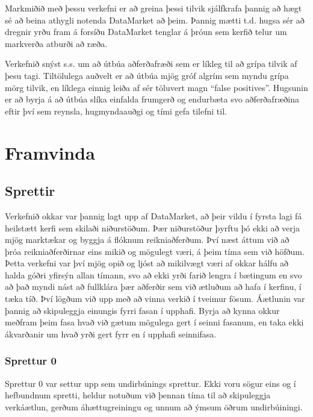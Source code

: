 \documentclass{article}
\begin{document}
Markmiðið með þessu verkefni er að greina þessi tilvik
sjálfkrafa þannig að hægt sé að beina athygli notenda
DataMarket að þeim. Þannig mætti t.d. hugsa sér að
dregnir yrðu fram á forsíðu DataMarket tenglar á þróun
sem kerfið telur um markverða atburði að ræða.

Verkefnið snýst s.s. um að útbúa aðferðafræði sem er
líkleg til að grípa tilvik af þesu tagi. Tiltölulega
auðvelt er að útbúa mjög gróf algrím sem myndu grípa
mörg tilvik, en líklega einnig leiða af sér töluvert
magn “false positives”. Hugsunin er að byrja á að útbúa
slíka einfalda frumgerð og endurbæta svo aðferðafræðina
eftir því sem reynsla, hugmyndaauðgi og tími gefa
tilefni til.

\newpage

\section{Framvinda}
\subsection{Sprettir}
Verkefnið okkar var þannig lagt upp af DataMarket, að þeir vildu í fyrsta lagi fá heilstætt kerfi sem skilaði niðurstöðum. 
Þær niðurstöður þyrftu þó ekki að verja mjög marktækar og byggja á flóknum reikniaðferðum. Því næst áttum við að þróa reikniaðferðirnar eins 
mikið og mögulegt væri, á þeim tíma sem við höfðum. Þetta verkefni var því mjög opið og ljóst að mikilvægt væri 
af okkar hálfu að halda góðri yfirsýn allan tímann, svo að ekki yrði farið lengra í bætingum en svo að það myndi nást að fullklára þær 
aðferðir sem við ætluðum að hafa í kerfinu, í tæka tíð. Því lögðum við upp með að vinna verkið í tveimur fösum. Áætlunin var þannig að skipuleggja
einungis fyrri fasan í upphafi. Byrja að kynna okkur meðfram þeim fasa hvað við gætum mögulega gert í seinni fasanum, en taka ekki ákvarðanir 
um hvað yrði gert fyrr en í upphafi seinnifasa.

\subsubsection{Sprettur 0}
Sprettur 0 var settur upp sem undirbúnings sprettur. Ekki voru sögur eins og í hefbundnum spretti, heldur notuðum við þennan tíma til að 
skipuleggja verkáætlun, gerðum áhættugreiningu og unnum að ýmsum öðrum undirbúiningi.
\end{document}
